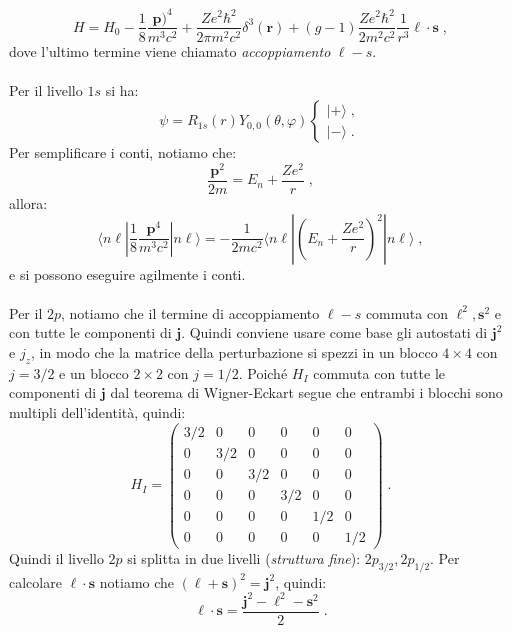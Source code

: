 \documentclass[10pt,a4paper]{report}
\theoremstyle{definition}
\numberwithin{equation}{section}
\newcommand{\bra}{\langle}
\newcommand{\ket}{\rangle}
\begin{document}
\begin{equation}
H=H_0-\frac{1}{8}\frac{\mathbf{p})^4}{m^3c^2}+\frac{Ze^2\hbar^2}{2\pi m^2c^2}\delta^3(\mathbf{r})+(g-1)\frac{Ze^2\hbar^2}{2m^2c^2}\frac{1}{r^3}\boldsymbol{\ell}\cdot\mathbf{s}\;,
\end{equation}
dove l'ultimo termine viene chiamato \textit{accoppiamento} $\ell-s$. \\
\\
Per il livello $1s$ si ha:
$$
\psi=R_{1s}(r)Y_{0,0}(\theta,\varphi)\begin{cases}
|+\ket\;, \\
|-\ket\;.
\end{cases}
$$
Per semplificare i conti, notiamo che:
\begin{equation*}
\frac{\mathbf{p}^2}{2m}=E_n+\frac{Ze^2}{r}\;,
\end{equation*}
allora:
\begin{equation}
\bra n\ell|\frac{1}{8}\frac{\mathbf{p}^4}{m^3c^2}|n\ell\ket=-\frac{1}{2mc^2}\bra n\ell|\left(E_n+\frac{Ze^2}{r}\right)^2|n\ell\ket\;,
\end{equation}
e si possono eseguire agilmente i conti. \\
\\
Per il $2p$, notiamo che il termine di accoppiamento $\ell-s$ commuta con $\boldsymbol{\ell}^2,\mathbf{s}^2$ e con tutte le componenti di $\mathbf{j}$. Quindi conviene usare come base gli autostati di $\mathbf{j}^2$ e $j_z$, in modo che la matrice della perturbazione si spezzi in un blocco $4\times 4$ con $j=3/2$ e un blocco $2\times 2$ con $j=1/2$. Poiché $H_I$ commuta con tutte le componenti di $\mathbf{j}$ dal teorema di Wigner-Eckart segue che entrambi i blocchi sono multipli dell'identità, quindi:
\begin{equation}
H_I=\left(\begin{matrix}
3/2 & 0 & 0 & 0 & 0 & 0 \\
0 & 3/2 & 0 & 0 & 0 & 0 \\
0 & 0 & 3/2 & 0 & 0 & 0 \\
0 & 0 & 0 & 3/2 & 0 & 0 \\
0 & 0 & 0 & 0 & 1/2 & 0 \\
0 & 0 & 0 & 0 & 0 & 1/2
\end{matrix}\right)\;.
\end{equation}
Quindi il livello $2p$ si splitta in due livelli (\textit{struttura fine}): $2p_{3/2},2p_{1/2}$. Per calcolare $\boldsymbol{\ell}\cdot\mathbf{s}$ notiamo che $(\boldsymbol{\ell}+\mathbf{s})^2=\mathbf{j}^2$, quindi:
\begin{equation}
\boldsymbol{\ell}\cdot\mathbf{s}=\frac{\mathbf{j}^2-\boldsymbol{\ell}^2-\mathbf{s}^2}{2}\;.
\end{equation}
\end{document}
